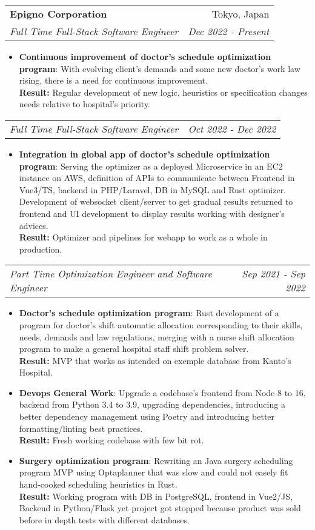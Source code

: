 \documentclass[letterpaper,11pt]{article}
\makeatletter
\newcommand{\resumeItem}[2]{
  \item\small{
    \textbf{#1}{: #2 \vspace{-2pt}}
  }
}
\newcommand{\resumeSubheading}[4]{
  \vspace{-1pt}\item
    \begin{tabular*}{0.97\textwidth}[t]{l@{\extracolsep{\fill}}r}
      \textbf{#1} & #2 \\
      \textit{\small#3} & \textit{\small #4} \\
    \end{tabular*}\vspace{-5pt}
}
\newcommand{\resumeSubSubheading}[2]{
    \begin{tabular*}{0.97\textwidth}{l@{\extracolsep{\fill}}r}
      \textit{\small#1} & \textit{\small #2} \\
    \end{tabular*}\vspace{-5pt}
}
\newcommand{\resumeItemListStart}{\begin{itemize}}
\newcommand{\resumeItemListEnd}{\end{itemize}\vspace{-5pt}}
\makeatother
\begin{document}
    \resumeSubheading
      {Epigno Corporation}{Tokyo, Japan}
      {Full Time Full-Stack Software Engineer}{Dec 2022 - Present}
      \resumeItemListStart
       \resumeItem{Continuous improvement of doctor's schedule optimization program}
         {With evolving client's demands and some new doctor's work law rising, there is a need for continuous improvement.
         \\\textbf{Result:} Regular development of new logic, heuristics or specification changes needs relative to hospital's priority.}
      \resumeItemListEnd
   \resumeSubSubheading
      {Full Time Full-Stack Software Engineer}{Oct 2022 - Dec 2022}
      \resumeItemListStart
       \resumeItem{Integration in global app of doctor's schedule optimization program}
         {Serving the optimizer as a deployed Microservice in an EC2 instance on AWS, definition of APIs to communicate between Frontend in Vue3/TS, backend in PHP/Laravel, DB in MySQL and Rust optimizer. Development of websocket client/server to get gradual results returned to frontend and UI development to display results working with designer's advices.
         \\\textbf{Result:} Optimizer and pipelines for webapp to work as a whole in production.}
      \resumeItemListEnd
   \resumeSubSubheading
    {Part Time Optimization Engineer and Software Engineer}{Sep 2021 - Sep 2022}
    \resumeItemListStart
       \resumeItem{Doctor's schedule optimization program}
         {Rust development of a program for doctor's shift automatic allocation corresponding to their skills, needs, demands and law regulations, merging with a nurse shift allocation program to make a general hospital staff shift problem solver.
         \\\textbf{Result:} MVP that works as intended on exemple database from Kanto's Hospital.}
       \resumeItem{Devops General Work}
         {Upgrade a codebase's frontend from Node 8 to 16, backend from Python 3.4 to 3.9, upgrading dependencies, introducing a better dependency management using Poetry and introducing better formatting/linting best practices.
         \\\textbf{Result:} Fresh working codebase with few bit rot.}
       \resumeItem{Surgery optimization program}
         {Rewriting an Java surgery scheduling program MVP using Optaplanner that was slow and could not easely fit hand-cooked scheduling heuristics in Rust.
         \\\textbf{Result:} Working program with DB in PostgreSQL, frontend in Vue2/JS, Backend in Python/Flask yet project got stopped because product was sold before in depth tests with different databases.}
    \resumeItemListEnd
\end{document}
